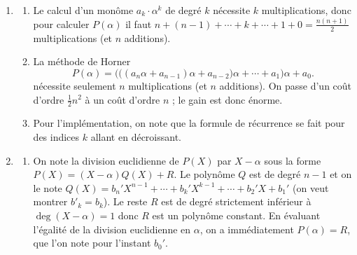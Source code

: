 \documentclass[class=report,crop=false]{standalone}
\begin{document}
\begin{enumerate}
  \item 
  \begin{enumerate}
    \item Le calcul d'un monôme $a_k\cdot \alpha^k$ de degré $k$ nécessite $k$ multiplications, donc pour calculer
    $P(\alpha)$ il faut $n+(n-1)+\cdots+k+\cdots+1+0 = \frac{n(n+1)}{2}$ multiplications (et $n$ additions).
    
    \item La méthode de Horner 
    $$P(\alpha) =  \Big(\big((a_n \alpha+a_{n-1})\alpha +a_{n-2} \big) \alpha + \cdots + a_1\Big) \alpha +a_0.$$
    nécessite seulement $n$ multiplications (et $n$ additions). 
    On passe d'un coût d'ordre $\frac12n^2$ à un coût d'ordre $n$ ; le gain est donc énorme.
     
    \item Pour l'implémentation, on note que la formule de récurrence 
    se fait pour des indices $k$ allant en décroissant.
  
  


  \end{enumerate} 
  \item 
  \begin{enumerate}
    \item On note la division euclidienne de $P(X)$ par $X-\alpha$ sous la forme
    $P(X) = (X-\alpha)Q(X) + R$. Le polynôme $Q$ est de degré $n-1$ et on le note
    $Q(X) = b_{n}'X^{n-1}+\cdots+ b_k'X^{k-1}+\cdots +b_2'X+b_1'$ (on veut montrer $b'_k=b_k$).
    Le reste $R$ est de degré strictement inférieur à $\deg (X-\alpha) = 1$ donc $R$ est un polynôme constant.
    En évaluant l'égalité de la division euclidienne en $\alpha$, on a immédiatement $P(\alpha)=R$, 
    que l'on note pour l'instant $b_0'$.
    

\end{enumerate}
\end{enumerate}
\end{document}
